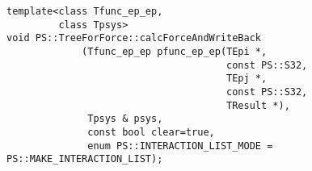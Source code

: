 
\begin{screen}
\begin{verbatim}
template<class Tfunc_ep_ep,
         class Tpsys>
void PS::TreeForForce::calcForceAndWriteBack
             (Tfunc_ep_ep pfunc_ep_ep(TEpi *,
                                      const PS::S32,
                                      TEpj *,
                                      const PS::S32,
                                      TResult *),
              Tpsys & psys,
              const bool clear=true,
              enum PS::INTERACTION_LIST_MODE = PS::MAKE_INTERACTION_LIST);
\end{verbatim}
\end{screen}


